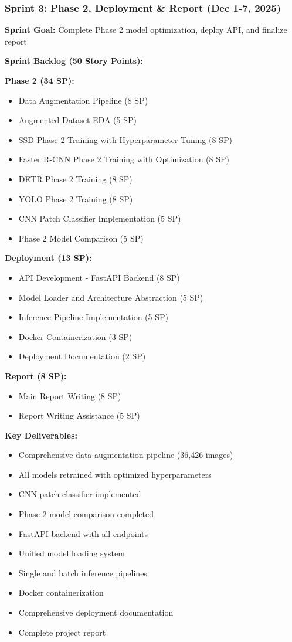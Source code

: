 \documentclass[12pt,a4paper]{article}
\begin{document}
\subsubsection{Sprint 3: Phase 2, Deployment \& Report (Dec 1-7, 2025)}

\textbf{Sprint Goal:} Complete Phase 2 model optimization, deploy API, and finalize report

\textbf{Sprint Backlog (50 Story Points):}

\textbf{Phase 2 (34 SP):}
\begin{itemize}
    \item Data Augmentation Pipeline (8 SP)
    \item Augmented Dataset EDA (5 SP)
    \item SSD Phase 2 Training with Hyperparameter Tuning (8 SP)
    \item Faster R-CNN Phase 2 Training with Optimization (8 SP)
    \item DETR Phase 2 Training (8 SP)
    \item YOLO Phase 2 Training (8 SP)
    \item CNN Patch Classifier Implementation (5 SP)
    \item Phase 2 Model Comparison (5 SP)
\end{itemize}

\textbf{Deployment (13 SP):}
\begin{itemize}
    \item API Development - FastAPI Backend (8 SP)
    \item Model Loader and Architecture Abstraction (5 SP)
    \item Inference Pipeline Implementation (5 SP)
    \item Docker Containerization (3 SP)
    \item Deployment Documentation (2 SP)
\end{itemize}

\textbf{Report (8 SP):}
\begin{itemize}
    \item Main Report Writing (8 SP)
    \item Report Writing Assistance (5 SP)
\end{itemize}

\textbf{Key Deliverables:}
\begin{itemize}
    \item Comprehensive data augmentation pipeline (36,426 images)
    \item All models retrained with optimized hyperparameters
    \item CNN patch classifier implemented
    \item Phase 2 model comparison completed
    \item FastAPI backend with all endpoints
    \item Unified model loading system
    \item Single and batch inference pipelines
    \item Docker containerization
    \item Comprehensive deployment documentation
    \item Complete project report
\end{itemize}
\end{document}
